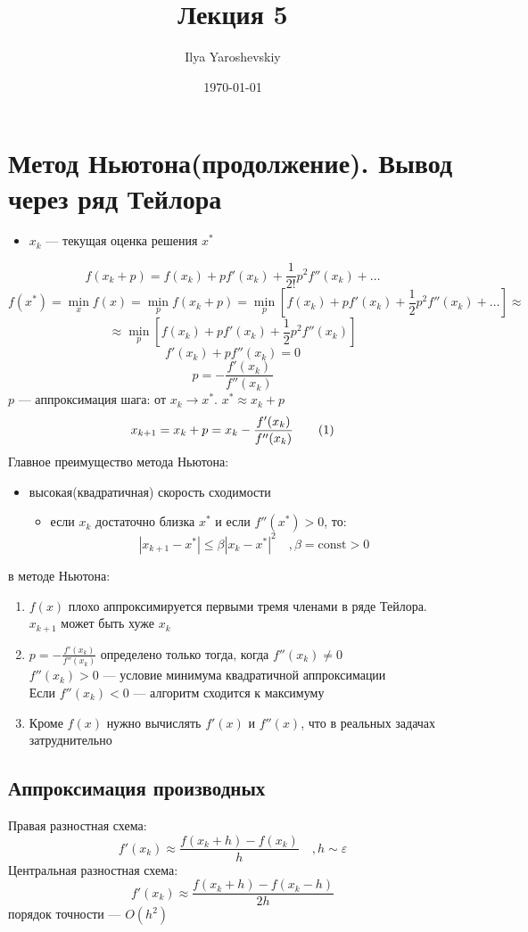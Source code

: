 \documentclass[english]{article}
\author{Ilya Yaroshevskiy}
\date{\today}
\title{Лекция 5}
\newcommand\addtag{\refstepcounter{equation}\tag{\theequation}}
\newcommand{\const}{\text{const}}
\theoremstyle{plain}
\theoremstyle{remark}
\theoremstyle{definition}
\begin{document}
\maketitle
\tableofcontents



\section{Метод Ньютона(продолжение). Вывод через ряд Тейлора}
\label{sec:org6986af2}
\begin{itemize}
\item \(x_k\) --- текущая оценка решения \(x^*\)
\end{itemize}
\[ f(x_k + p) = f(x_k) + pf'(x_k) + \frac{1}{2!}p^2f''(x_k) + \dots \]
\[ f(x^*) = \min_x f(x) = \min_p f(x_k + p) = \min_p [ f(x_k) + pf'(x_k) + \frac{1}{2}p^2 f''(x_k)  + \dots ] \approx \]
\[ \approx \min_p[f(x_k) + pf'(x_k) + \frac{1}{2}p^2 f''(x_k)] \]
\[ f'(x_k) + pf''(x_k) = 0 \]
\[ p = -\frac{f'(x_k)}{f''(x_k)} \]
\(p\) --- аппроксимация шага: от \(x_k \to x^*\). \(x^* \approx x_k + p\)
\[ x_{k + 1} = x_k + p = x_k - \frac{f'(x_k)}{f''(x_k)} \label{nuton_1_5}\addtag \]
Главное преимущество метода Ньютона:
\begin{itemize}
\item высокая(квадратичная) скорость сходимости
\begin{itemize}
\item если \(x_k\) достаточно близка \(x^*\) и если \(f''(x^*) > 0\), то:
\[ |x_{k+1} - x^*| \le \beta|x_k - x^*|^2\quad, \beta = \const > 0 \]
\end{itemize}
\end{itemize}

 в методе Ньютона:
\begin{enumerate}
\item \(f(x)\) плохо аппроксимируется первыми тремя членами в ряде Тейлора. \(x_{k+1}\) может быть хуже \(x_k\)
\item \(p=-\frac{f'(x_k)}{f''(x_k)}\) определено только тогда, когда \(f''(x_k)\neq0\) \\
\(f''(x_k) > 0\) --- условие минимума квадратичной аппроксимации \\
Если \(f''(x_k) < 0\) --- алгоритм сходится к максимуму
\item Кроме \(f(x)\) нужно вычислять \(f'(x)\) и \(f''(x)\), что в реальных задачах затруднительно
\end{enumerate}
\subsection{Аппроксимация производных}
\label{sec:org0d138ce}
Правая разностная схема:
\[ f'(x_k) \approx \frac{f(x_k + h) - f(x_k)}{h}\quad ,h \sim \varepsilon \]
Центральная разностная схема:
\[ f'(x_k) \approx \frac{f(x_k + h) - f(x_k - h)}{2h} \]
порядок точности --- \(O(h^2)\)
\end{document}
